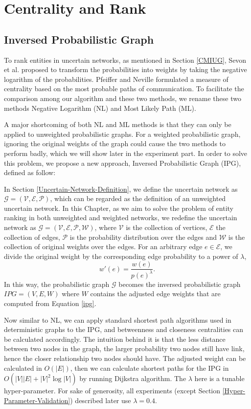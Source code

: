 \documentclass[\main/thesis.tex]{subfiles}
\begin{document}
\chapter{Centrality and Rank}

\section{Inversed Probabilistic Graph}
To rank entities in uncertain networks, as mentioned in Section \ref{CMIUG}, Sevon et al. \cite{sevon2006link} proposed to transform the probabilities into weights by taking the negative logarithm of the probabilities. Pfeiffer and Neville \cite{pfeiffer2010probabilistic} formulated a measure of centrality based on the most probable paths of communication. To facilitate the comparison among our algorithm and these two methods, we rename these two methods Negative Logarithm (NL) and Most Likely Path (ML).

A major shortcoming of both NL and ML methods is that they can only be applied to unweighted probabilistic graphs. For a weighted probabilistic graph, ignoring the original weights of the graph could cause the two methods to perform badly, which we will show later in the experiment part. In order to solve this problem, we propose a new approach, Inversed Probabilistic Graph (IPG), defined as follow:

In Section \ref{Uncertain-Network-Definition}, we define the uncertain network as $\mathcal{G = (V,E,P)}$, which can be regarded as the definition of an unweighted uncertain network. In this Chapter, as we aim to solve the problem of entity ranking in both unweighted and weighted networks, we redefine the uncertain network as $\mathcal{G = (V,E,P,W)}$, where $\mathcal{V}$ is the collection of vertices, $\mathcal{E}$ the collection of edges, $\mathcal{P}$ is the probability distribution over the edges and $\mathcal{W}$ is the collection of original weights over the edges. For an arbitrary edge $e \in \mathcal{E}$, we divide the original weight by the corresponding edge probability to a power of $\lambda$,
\begin{equation}
w'(e) = \frac{w(e)}{p(e)^\lambda }. \label{ipg}
\end{equation}
In this way, the probabilistic graph $\mathcal{G}$ becomes the inversed probabilistic graph $IPG = (V, E, W)$ where $W$ contains the adjusted edge weights that are computed from Equation \ref{ipg}.

Now similar to NL, we can apply standard shortest path algorithms used in deterministic graphs to the IPG, and betweenness and closeness centralities can be calculated accordingly. The intuition behind it is that the less distance between two nodes in the graph, the larger probability two nodes still have link, hence the closer relationship two nodes should have. The adjusted weight can be calculated in $O(|E|)$, then we can calculate shortest paths for the IPG in $O(|V||E|+|V|^2 \log|V|)$ by running Dijkstra algorithm. The $\lambda$ here is a tunable hyper-parameter. For sake of generosity, all experiments (except Section \ref{Hyper-Parameter-Validation}) described later use $\lambda = 0.4$. 
\end{document}
